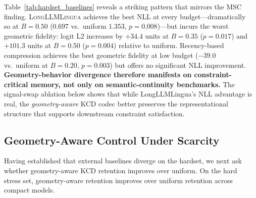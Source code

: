 \documentclass[11pt]{article}
\newcommand{\pname}[1]{\texttt{\small #1}}
\begin{document}
\begin{table}[t]
\centering
\caption{External baseline comparison on the hard stress set
(\pname{qwen25\_15b}, 9 conversations, 540 rows).
Lower is better. Significant differences vs.\ uniform are marked:
$^{*}p{<}0.05$, $^{**}p{<}0.01$, conversation-level signflip test.}
\label{tab:hardset_baselines}
\end{table}

Table~\ref{tab:hardset_baselines} reveals a striking pattern that mirrors the MSC finding.
\textsc{LongLLMLingua} achieves the best NLL at every budget---dramatically so at
$B{=}0.50$ ($0.697$ vs.\ uniform $1.353$, $p{=}0.008$)---but incurs the worst
geometric fidelity: logit L2 increases by $+34.4$ units at $B{=}0.35$ ($p{=}0.017$)
and $+101.3$ units at $B{=}0.50$ ($p{=}0.004$) relative to uniform.
Recency-based compression achieves the best geometric fidelity at low budget
($-39.0$ vs.\ uniform at $B{=}0.20$, $p{=}0.003$) but offers no significant NLL
improvement.
\textbf{Geometry-behavior divergence therefore manifests on constraint-critical
memory, not only on semantic-continuity benchmarks.}
The signal-swap ablation below shows that while LongLLMLingua's NLL advantage
is real, the \emph{geometry-aware} KCD codec better preserves the representational
structure that supports downstream constraint satisfaction.

\subsection{Geometry-Aware Control Under Scarcity}
Having established that external baselines diverge on the hardset, we next ask whether geometry-aware KCD retention improves over uniform. On the hard stress set, geometry-aware retention improves over uniform retention across compact models.
\end{document}
